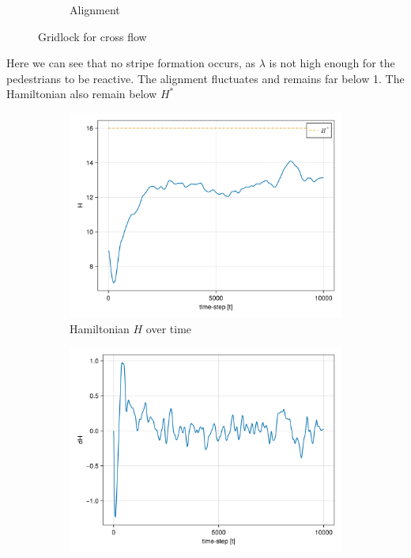 \begin{itemize}
\begin{figure}[H]
\begin{subfigure}{.49\textwidth}
            \caption{Alignment}
            \label{plot:crossgridlock_alignment}
        \end{subfigure}
        \caption{Gridlock for cross flow}
        \label{plot:crossgridlock}
    \end{figure}
Here we can see that no stripe formation occurs, as $\lambda$ is not high enough for the pedestrians to be reactive. The alignment fluctuates and remains far below 1. The Hamiltonian also remain below $H^*$
\end{itemize}

    \begin{figure}[H]
        \centering
        \begin{subfigure}{.49\textwidth}
            \centering
            \includegraphics[width=\linewidth]{figures/ch5_collective/H_gridlock_cross.png}
            \caption{Hamiltonian $H$ over time}
            \label{plot:crossgridlock_h}
        \end{subfigure}
        \begin{subfigure}{.49\textwidth}
            \centering
            \includegraphics[width=\linewidth]{figures/ch5_collective/dH_gridlock_cross.png}

\end{subfigure}
\end{figure}
